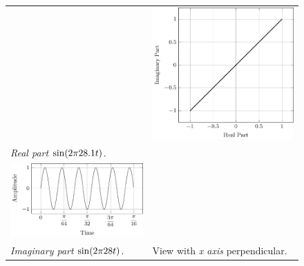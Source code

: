 \documentclass[../../course]{subfiles}
\begin{document}
\begin{figure} [H]
\begin{NiceTabularX} {\textwidth} {
            *{2}{>{\centering\arraybackslash}X}
        }
        &

         {
             {
                \includegraphics[height = \textheight] {tikzpics/plotFrontViewComplexE.pdf}
            }
        }

        \\

         {\emph{Real part} $\sin(2 \pi 28.1 t)$.}
        \label{plt:realCmplxE}

        &
        \\

         {
             {
                \includegraphics[height = \textheight] {tikzpics/plotShortX1.pdf}
            }
        }

        &
        \\

         {\emph{Imaginary part} $\sin(2 \pi 28 t)$.}
        \label{plt:imagCmplxE}

        &

         {View with \emph{x axis} perpendicular.}
        \label{plt:frontViewCmplxE}

        \\

    \end{NiceTabularX}

\end{figure}
\end{document}
